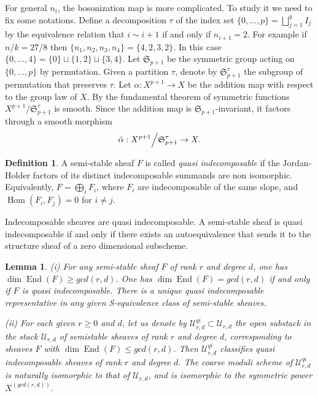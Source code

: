 \documentclass[reqno]{amsart}
\newtheorem{lemma}[theorem]{Lemma}
\theoremstyle{definition}
\newtheorem{definition}[theorem]{Definition}
\theoremstyle{remark}
\newcommand{\Hom}{\operatorname{Hom}}
\newcommand{\sub}{\subset}
\newcommand{\End}{\operatorname{End}}
\newcommand{\cU}{\mathcal{U}}
\newcommand{\fS}{\mathfrak{S}}
\numberwithin{equation}{section}
\begin{document}
For general $n_i$, the bosonization map is more complicated. To study it we need to fix some notations. Define a decomposition $\tau$ of the index set $\{0,\ldots,p\}=\bigsqcup_{j=1}^q I_j$ by the equivalence relation that $i\sim i+1$ if and only if $n_{i+1}=2$. For example if $n/k=27/8$ then $\{n_1,n_2,n_3,n_4\}=\{4,2,3,2\}$. In this case $\{0,\ldots,4\}=\{0\}\sqcup \{1,2\}\sqcup \{3,4\}$. Let $\mathfrak{S}_{p+1}$ be the symmetric group acting on $\{0,\ldots,p\}$ by permutation. Given a partition $\tau$, denote by $\fS^\tau_{p+1}$ the subgroup of permutation that preserves $\tau$. Let $\alpha: X^{p+1}\to X$ be the addition map with respect to the group law of $X$. 
By the fundamental theorem of symmetric functions $X^{p+1}/\fS_{p+1}^\tau$ is smooth. 
Since the addition map is $\fS_{p+1}$-invariant,  it factors through a smooth morphism
\[
\bar{\alpha}: X^{p+1}\Big\slash \fS^\tau_{p+1} \to X.
\]  

\begin{definition}
A semi-stable sheaf $F$ is called \emph{quasi indecomposable} if the Jordan-Holder factors of its distinct indecomposable summands are non isomorphic. 
Equivalently, $F=\bigoplus_i F_i$, where $F_i$ are indecomposable of the same slope, and $\Hom(F_i,F_j)=0$ for $i\neq j$.
\end{definition}

Indecomposable sheaves are quasi indecomposable. A semi-stable sheaf is quasi indecomposable if and only if there exists an autoequivalence that sends it to the structure sheaf of a zero dimensional subscheme.

\begin{lemma}\label{lem:qi-moduli}
(i) For any semi-stable sheaf $F$ of rank $r$ and degree $d$, one has $\dim\End(F)\ge gcd(r,d)$. One has $\dim\End(F)=gcd(r,d)$ if and only if $F$ is quasi indecomposable.
There is a unique quasi indecomposable representative in any given S-equivalence class of semi-stable sheaves.

(ii) For each given $r\ge 0$ and $d$, let us denote by $\cU^{qi}_{r,d}\sub \cU_{r,d}$ the open substack 
 in the stack $\cU_{r,d}$ of semistable sheaves of rank $r$ and degree $d$, corresponding to sheaves $F$ with $\dim\End(F)\le gcd(r,d)$.
Then $\cU^{qi}_{r,d}$ classifies quasi indecomposable sheaves of rank $r$ and degree $d$.
The coarse moduli scheme of $\cU^{qi}_{r,d}$ is naturally isomorphic to that of $\cU_{r,d}$, and is isomorphic to the symmetric power $X^{(gcd(r,d))}$.
\end{lemma}
\end{document}
